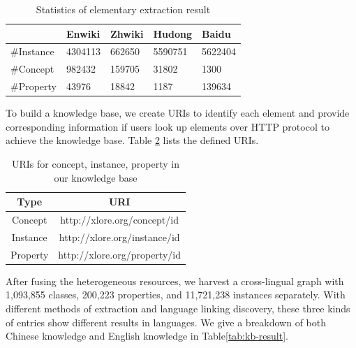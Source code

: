 \documentclass[runningheads,a4paper]{llncs}
\begin{document}
\begin{table}[h]
\small
\centering
\caption{Statistics of elementary extraction result}
\label{tab:extract-result}
    \begin{tabular}{|l|l|l|l|l|}
        \hline
                 & Enwiki  & Zhwiki & Hudong  & Baidu   \\ \hline
        \#Instance & 4304113 & 662650 & 5590751 & 5622404 \\ \hline
        \#Concept  & 982432  & 159705 & 31802   & 1300    \\ \hline
        \#Property & 43976   & 18842  & 1187    & 139634  \\ \hline
    \end{tabular}
\end{table}

To build a knowledge base, we create URIs to identify each element and provide corresponding information if users look up elements over HTTP protocol to achieve the knowledge base. Table \ref{tab:uris} lists the defined URIs.
\begin{table}[h]
\small
\centering
\caption{URIs for concept, instance, property in our knowledge base}
\label{tab:uris}
    \begin{tabular}{|c|c|}
        \hline
        Type     & URI                          \\ \hline
        Concept  & http://xlore.org/concept/id  \\ \hline
        Instance & http://xlore.org/instance/id \\ \hline
        Property & http://xlore.org/property/id \\ \hline
    \end{tabular}
\end{table}

After fusing the heterogeneous resources, we harvest a cross-lingual graph with 1,093,855 classes, 200,223 properties, and 11,721,238 instances separately. With different methods of extraction and language linking discovery, these three kinds of entries show different results in languages. We give a breakdown of both Chinese knowledge and English knowledge in Table\ref{tab:kb-result}.
\end{document}
